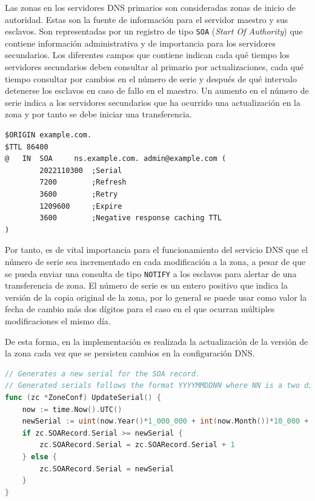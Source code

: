 Las zonas en los servidores DNS primarios son consideradas zonas de inicio de autoridad. Estas son la fuente de información para el servidor maestro y sus esclavos. Son representadas por un registro de tipo \verb|SOA| (\textit{Start Of Authority}) que contiene información administrativa y de importancia para los servidores secundarios. Los diferentes campos que contiene indican cada qué tiempo los servidores secundarios deben consultar al primario por actualizaciones, cada qué tiempo consultar por cambios en el número de serie y después de qué intervalo detenerse los esclavos en caso de fallo en el maestro. Un aumento en el número de serie indica a los servidores secundarios que ha ocurrido una actualización en la zona y por tanto se debe iniciar una transferencia.

\begin{lstlisting}[frame=single, numbers=none, caption=Ejemplo de zona con \textit{SOA}.]
$ORIGIN example.com.
$TTL 86400
@   IN  SOA     ns.example.com. admin@example.com (
        2022110300  ;Serial
        7200        ;Refresh
        3600        ;Retry
        1209600     ;Expire
        3600        ;Negative response caching TTL
)
\end{lstlisting}

Por tanto, es de vital importancia para el funcionamiento del servicio DNS que el número de serie sea incrementado en cada modificación a la zona, a pesar de que se pueda enviar una consulta de tipo \verb|NOTIFY| a los esclavos para alertar de una transferencia de zona. El número de serie es un entero positivo que indica la versión de la copia original de la zona, por lo general se puede usar como valor la fecha de cambio más dos dígitos para el caso en el que ocurran múltiples modificaciones el mismo día.

De esta forma, en la implementación es realizada la actualización de la versión de la zona cada vez que se persisten cambios en la configuración DNS.

\begin{lstlisting}[frame=single, language=Go]
// Generates a new serial for the SOA record.
// Generated serials follows the format YYYYMMDDNN where NN is a two digits identifier.
func (zc *ZoneConf) UpdateSerial() {
    now := time.Now().UTC()
    newSerial := uint(now.Year()*1_000_000 + int(now.Month())*10_000 + now.Day()*100)
    if zc.SOARecord.Serial >= newSerial {
        zc.SOARecord.Serial = zc.SOARecord.Serial + 1
    } else {
        zc.SOARecord.Serial = newSerial
    }
}
\end{lstlisting}

